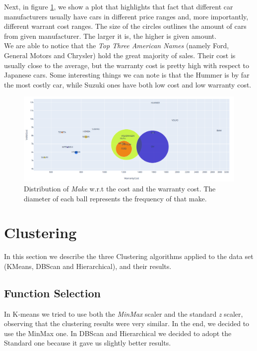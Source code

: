 \documentclass{article}
\begin{document}
	Next, in figure \ref{fig:fantastic}, we show a plot that highlights that fact that different car manufacturers usually have cars in different price ranges and, more importantly, different warrant cost ranges. The size of the circles outlines the amount of cars from given manufacturer. The larger it is, the higher is given amount. \\
	We are able to notice that the \emph{Top Three American Names} (namely Ford, General Motors and Chrysler) hold the great majority of sales. Their cost is usually close to the average, but the warranty cost is pretty high with respect to Japanese cars. Some interesting things we can note is that the Hummer is by far the most costly car, while Suzuki ones have both low cost and low warranty cost.
	\begin{figure}[H]
		\centering
		\captionsetup{justification=centering}
		\includegraphics[width=\textwidth, keepaspectratio]{fantastic} 
		\caption{Distribution of \emph{Make} w.r.t the cost and the warranty cost. The diameter of each ball represents the frequency of that make.}
		\label{fig:fantastic}
	\end{figure}
	
	
	\newpage
	\section{Clustering}
	\label{sec:clustering}
	In this section we describe the three Clustering algorithms applied to the data set (KMeans, DBScan and Hierarchical), and their results.
	
	\subsection{Function Selection}
	In K-means we tried to use both the \emph{MinMax} scaler and the standard \emph{z} scaler, observing that the clustering results were very similar. In the end, we decided to use the MinMax one.
	In DBScan and Hierarchical we decided to adopt the Standard one because it gave us slightly better results.
	
\end{document}
